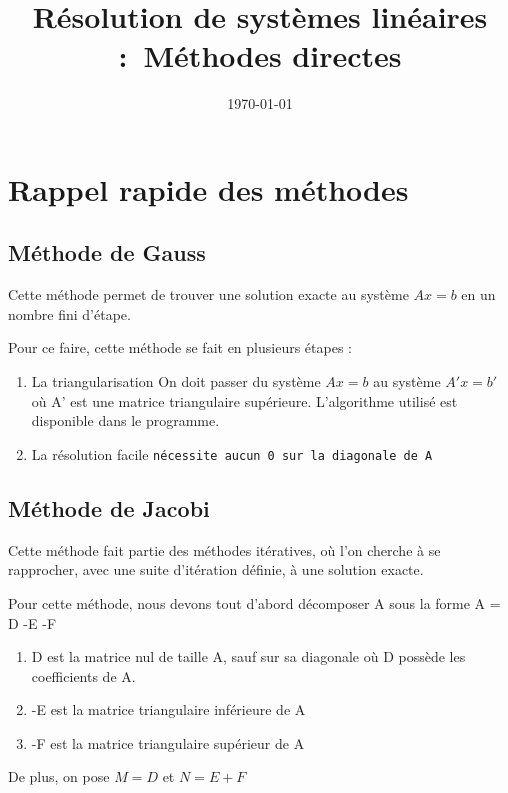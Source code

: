 \documentclass[letter]{article}
\date{\today}
\title{Résolution de systèmes linéaires : Méthodes directes}
\begin{document}



\setcounter{tocdepth}{3}
\tableofcontents

\newpage




\section{Rappel rapide des méthodes}
\label{sec:orgabada95}
\subsection{Méthode de Gauss}
\label{sec:org29f71f8}
Cette méthode permet de trouver une solution exacte au système \(Ax = b\) en un nombre fini d'étape.


Pour ce faire, cette méthode se fait en plusieurs étapes :

\begin{enumerate}
\item La triangularisation
On doit passer du système \(Ax=b\) au système \(A'x=b'\) où A' est une matrice triangulaire supérieure. L'algorithme utilisé est disponible dans le programme.
\item La résolution facile \texttt{nécessite aucun 0 sur la diagonale de A}
\end{enumerate}

\subsection{Méthode de Jacobi}
\label{sec:orgeefc8ee}

Cette méthode fait partie des méthodes itératives, où l'on cherche à se rapprocher, avec une suite d'itération définie, à une solution exacte.

Pour cette méthode, nous devons tout d'abord décomposer A sous la forme A = D -E -F

\begin{enumerate}
\item D est la matrice nul de taille A, sauf sur sa diagonale où D possède les coefficients de A.
\item -E est la matrice triangulaire inférieure de A
\item -F est la matrice triangulaire supérieur de A
\end{enumerate}



De plus, on pose \(M = D\) et \(N = E + F\)
\end{document}
